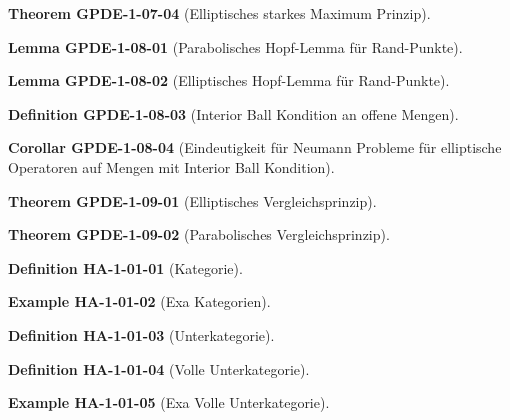 \documentclass[10pt, letterpaper]{article}
\newcommand{\CustomHeading}[3]{%
  \par\medskip\noindent%
  \textbf{#1 #2} \textnormal{(#3)}.\enskip%
}
\newenvironment{DEF}[2]{\CustomHeading{Definition}{#1}{#2}}{}
\newenvironment{THEO}[2]{\CustomHeading{Theorem}{#1}{#2}}{}
\newenvironment{LEM}[2]{\CustomHeading{Lemma}{#1}{#2}}{}
\newenvironment{KORO}[2]{\CustomHeading{Corollar}{#1}{#2}}{}
\newenvironment{EXA}[2]{\CustomHeading{Example}{#1}{#2}}{}
\begin{document}
\begin{THEO}{GPDE-1-07-04}{Elliptisches starkes Maximum Prinzip}
\end{THEO}

\begin{LEM}{GPDE-1-08-01}{Parabolisches Hopf-Lemma für Rand-Punkte}
\end{LEM}

\begin{LEM}{GPDE-1-08-02}{Elliptisches Hopf-Lemma für Rand-Punkte}
\end{LEM}

\begin{DEF}{GPDE-1-08-03}{Interior Ball Kondition an offene Mengen}
\end{DEF}

\begin{KORO}{GPDE-1-08-04}{Eindeutigkeit für Neumann Probleme für elliptische Operatoren auf Mengen mit Interior Ball Kondition}
\end{KORO}

\begin{THEO}{GPDE-1-09-01}{Elliptisches Vergleichsprinzip}
\end{THEO}

\begin{THEO}{GPDE-1-09-02}{Parabolisches Vergleichsprinzip}
\end{THEO}

\begin{DEF}{HA-1-01-01}{Kategorie}
\end{DEF}

\begin{EXA}{HA-1-01-02}{Exa Kategorien}
\end{EXA}

\begin{DEF}{HA-1-01-03}{Unterkategorie}
\end{DEF}

\begin{DEF}{HA-1-01-04}{Volle Unterkategorie}
\end{DEF}

\begin{EXA}{HA-1-01-05}{Exa Volle Unterkategorie}
\end{EXA}
\end{document}
